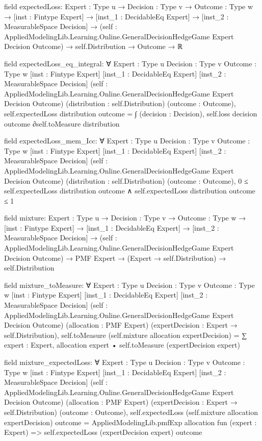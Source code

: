 \documentclass[10pt]{article}
\begin{document}
\begin{ReviewVerbatim}
field expectedLoss:
{Expert : Type u} →
  {Decision : Type v} →
    {Outcome : Type w} →
      [inst : Fintype Expert] →
        [inst_1 : DecidableEq Expert] →
          [inst_2 : MeasurableSpace Decision] →
            (self : AppliedModelingLib.Learning.Online.GeneralDecisionHedgeGame Expert Decision Outcome) →
              self.Distribution → Outcome → ℝ

field expectedLoss_eq_integral:
∀ {Expert : Type u} {Decision : Type v} {Outcome : Type w} [inst : Fintype Expert] [inst_1 : DecidableEq Expert]
  [inst_2 : MeasurableSpace Decision]
  (self : AppliedModelingLib.Learning.Online.GeneralDecisionHedgeGame Expert Decision Outcome)
  (distribution : self.Distribution) (outcome : Outcome),
  self.expectedLoss distribution outcome =
    ∫ (decision : Decision), self.loss decision outcome ∂self.toMeasure distribution

field expectedLoss_mem_Icc:
∀ {Expert : Type u} {Decision : Type v} {Outcome : Type w} [inst : Fintype Expert] [inst_1 : DecidableEq Expert]
  [inst_2 : MeasurableSpace Decision]
  (self : AppliedModelingLib.Learning.Online.GeneralDecisionHedgeGame Expert Decision Outcome)
  (distribution : self.Distribution) (outcome : Outcome),
  0 ≤ self.expectedLoss distribution outcome ∧ self.expectedLoss distribution outcome ≤ 1

field mixture:
{Expert : Type u} →
  {Decision : Type v} →
    {Outcome : Type w} →
      [inst : Fintype Expert] →
        [inst_1 : DecidableEq Expert] →
          [inst_2 : MeasurableSpace Decision] →
            (self : AppliedModelingLib.Learning.Online.GeneralDecisionHedgeGame Expert Decision Outcome) →
              PMF Expert → (Expert → self.Distribution) → self.Distribution

field mixture_toMeasure:
∀ {Expert : Type u} {Decision : Type v} {Outcome : Type w} [inst : Fintype Expert] [inst_1 : DecidableEq Expert]
  [inst_2 : MeasurableSpace Decision]
  (self : AppliedModelingLib.Learning.Online.GeneralDecisionHedgeGame Expert Decision Outcome) (allocation : PMF Expert)
  (expertDecision : Expert → self.Distribution),
  self.toMeasure (self.mixture allocation expertDecision) =
    ∑ expert : Expert, allocation expert • self.toMeasure (expertDecision expert)

field mixture_expectedLoss:
∀ {Expert : Type u} {Decision : Type v} {Outcome : Type w} [inst : Fintype Expert] [inst_1 : DecidableEq Expert]
  [inst_2 : MeasurableSpace Decision]
  (self : AppliedModelingLib.Learning.Online.GeneralDecisionHedgeGame Expert Decision Outcome) (allocation : PMF Expert)
  (expertDecision : Expert → self.Distribution) (outcome : Outcome),
  self.expectedLoss (self.mixture allocation expertDecision) outcome =
    AppliedModelingLib.pmfExp allocation fun (expert : Expert) => self.expectedLoss (expertDecision expert) outcome
\end{ReviewVerbatim}
\end{document}
